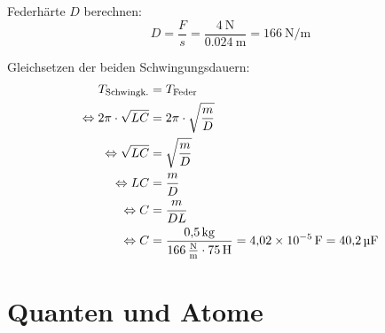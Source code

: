 \documentclass{ajc}
\begin{document}
	Federhärte $D$ berechnen:
	\begin{equation}
		D = \frac{F}{s} = \frac{\SI{4}{\newton}}{\SI{0,024}{\m}} = \SI{166}{\newton\per\meter}
	\end{equation}
	
	Gleichsetzen der beiden Schwingungsdauern:
	\begin{equation}
		\begin{split}
			T_\text{Schwingk.} &= T_\text{Feder}\\
			\Leftrightarrow 2\pi \cdot \sqrt{LC} &= 2\pi \cdot \sqrt{\frac{m}{D}} \\
			\Leftrightarrow \sqrt{LC} &= \sqrt{\frac{m}{D}} \\
			\Leftrightarrow LC &= \frac{m}{D} \\
			\Leftrightarrow C &= \frac{m}{DL} \\
			\Leftrightarrow C &= \frac{\SI{0,5}{\kilogram}}{\SI{166}{\newton\per\meter} \cdot \SI{75}{\H}} = \SI{4,02e-5}{\farad} = \SI{40,2}{\micro\farad}
		\end{split}
	\end{equation}
	
	\section{Quanten und Atome}
\end{document}
